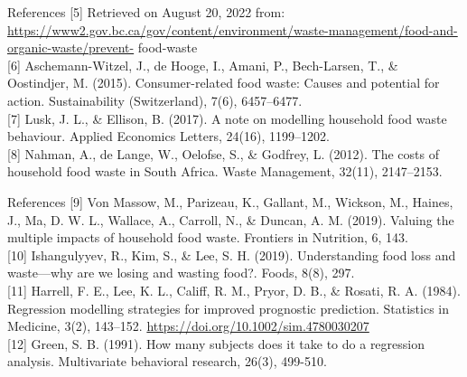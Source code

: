 \documentclass[
  ignorenonframetext,
]{beamer}
\begin{document}
\begin{frame}{References}
\protect\hypertarget{references-2}{}
{[}5{]} Retrieved on August 20, 2022 from:
\url{https://www2.gov.bc.ca/gov/content/environment/waste-management/food-and-organic-waste/prevent-}
food-waste\\
{[}6{]} Aschemann-Witzel, J., de Hooge, I., Amani, P., Bech-Larsen, T.,
\& Oostindjer, M. (2015). Consumer-related food waste: Causes and
potential for action. Sustainability (Switzerland), 7(6), 6457--6477.\\
{[}7{]} Lusk, J. L., \& Ellison, B. (2017). A note on modelling
household food waste behaviour. Applied Economics Letters, 24(16),
1199--1202.\\
{[}8{]} Nahman, A., de Lange, W., Oelofse, S., \& Godfrey, L. (2012).
The costs of household food waste in South Africa. Waste Management,
32(11), 2147--2153.\\
\end{frame}

\begin{frame}{References}
\protect\hypertarget{references-3}{}
{[}9{]} Von Massow, M., Parizeau, K., Gallant, M., Wickson, M., Haines,
J., Ma, D. W. L., Wallace, A., Carroll, N., \& Duncan, A. M. (2019).
Valuing the multiple impacts of household food waste. Frontiers in
Nutrition, 6, 143.\\
{[}10{]} Ishangulyyev, R., Kim, S., \& Lee, S. H. (2019). Understanding
food loss and waste---why are we losing and wasting food?. Foods, 8(8),
297.\\
{[}11{]} Harrell, F. E., Lee, K. L., Califf, R. M., Pryor, D. B., \&
Rosati, R. A. (1984). Regression modelling strategies for improved
prognostic prediction. Statistics in Medicine, 3(2), 143--152.
\url{https://doi.org/10.1002/sim.4780030207}\\
{[}12{]} Green, S. B. (1991). How many subjects does it take to do a
regression analysis. Multivariate behavioral research, 26(3), 499-510.\\
\end{frame}
\end{document}
